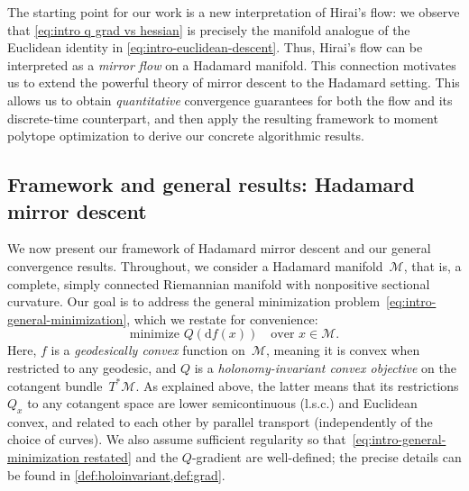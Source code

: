 \documentclass[11pt,letterpaper]{article}
\numberwithin{equation}{section}
\newcommand{\diff}{\mathrm{d}}
\newcommand{\MM}{\mathcal{M}}
\DeclareMathOperator{\PD}{PD}
\newcommand{\minproblem}[2]{\text{minimize } #1 \quad \text{over } #2}
\begin{document}
The starting point for our work is a new interpretation of Hirai's flow:
we observe that \cref{eq:intro q grad vs hessian} is precisely the manifold analogue of the Euclidean identity in \cref{eq:intro-euclidean-descent}.
Thus, Hirai's flow can be interpreted as a \emph{mirror flow} on a Hadamard manifold.
This connection motivates us to extend the powerful theory of mirror descent to the Hadamard setting.
This allows us to obtain \emph{quantitative} convergence guarantees for both the flow and its discrete-time counterpart, and then apply the resulting framework to moment polytope optimization to derive our concrete algorithmic results.

\subsection{Framework and general results: Hadamard mirror descent}\label{sub:intro framework}
We now present our framework of Hadamard mirror descent and our general convergence results.
Throughout, we consider a Hadamard manifold~$\MM$, that is, a complete, simply connected Riemannian manifold with nonpositive sectional curvature.
Our goal is to address the general minimization problem~\eqref{eq:intro-general-minimization}, which we restate for convenience:
\begin{equation}\label{eq:intro-general-minimization restated}
    \minproblem{Q(\diff f(x))}{x \in \MM}.
\end{equation}
Here, $f$ is a \emph{geodesically convex} function on~$\MM$, meaning it is convex when restricted to any geodesic, and $Q$ is a \emph{holonomy-invariant convex objective} on the cotangent bundle~$T^*\MM$.
As explained above, the latter means that its restrictions $Q_x$ to any cotangent space are lower semicontinuous (l.s.c.) and Euclidean convex, and related to each other by parallel transport (independently of the choice of curves).
We also assume sufficient regularity so that~\eqref{eq:intro-general-minimization restated} and the $Q$-gradient are well-defined; the precise details can be found in \cref{def:holoinvariant,def:grad}.

\end{document}
